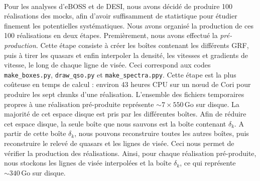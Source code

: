 \paragraph{}
Pour les analyses \lya{} d'eBOSS et de DESI, nous avons décidé de produire \num{100} réalisations des mocks, afin d'avoir suffisamment de statistique pour étudier finement les potentielles systématiques. Nous avons organisé la production de ces 100 réalisations en deux étapes. Premièrement, nous avons effectué la \emph{pré-production}. Cette étape consiste à créer les boîtes contenant les différents GRF, puis à tirer les quasars et enfin interpoler la densité, les vitesses et gradients de vitesse, le long de chaque ligne de visée. Ceci correspond aux codes \texttt{make\_boxes.py}, \texttt{draw\_qso.py} et \texttt{make\_spectra.ppy}. Cette étape est la plus coûteuse en temps de calcul : environ 43 heures CPU sur un nœud de Cori pour produire les sept chunks d'une réalisation. L'ensemble des fichiers temporaires propres à une réalisation pré-produite représente $\sim 7 \times \num{550}\,\mathrm{Go}$ sur disque.
La majorité de cet espace disque est pris par les différentes boîtes. Afin de réduire cet espace disque, la seule boîte que nous sauvons est la boîte contenant $\delta_k$.  %
  A partir de cette boîte $\delta_k$, nous pouvons reconstruire toutes les autres boîtes, puis reconstruire le relevé de quasars et les lignes de visée. Ceci nous permet de vérifier la production des réalisations.
  Ainsi, pour chaque réalisation pré-produite, nous stockons les lignes de visée interpolées et la boîte $\delta_k$, ce qui représente $\sim \num{340}\,\mathrm{Go}$ sur disque.

